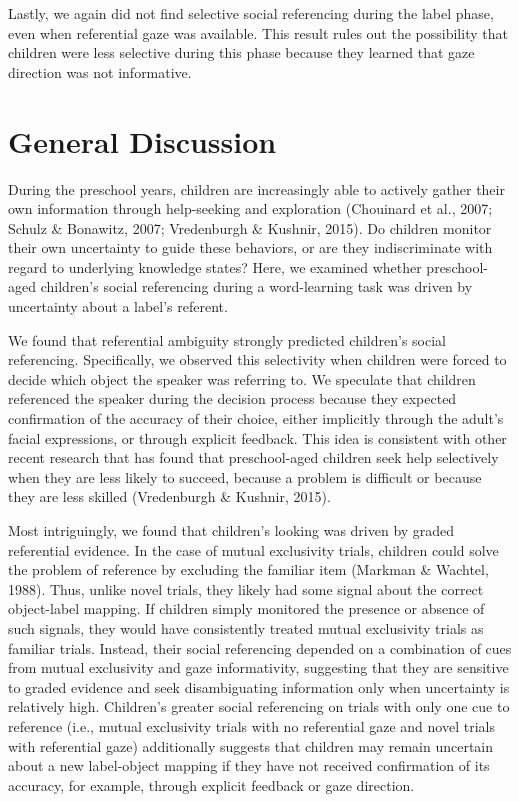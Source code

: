 \documentclass[10pt, letterpaper]{article}
\begin{document}
Lastly, we again did not find selective social referencing during the
label phase, even when referential gaze was available. This result rules
out the possibility that children were less selective during this phase
because they learned that gaze direction was not informative.

\section{General Discussion}\label{general-discussion}

During the preschool years, children are increasingly able to actively
gather their own information through help-seeking and exploration
(Chouinard et al., 2007; Schulz \& Bonawitz, 2007; Vredenburgh \&
Kushnir, 2015). Do children monitor their own uncertainty to guide these
behaviors, or are they indiscriminate with regard to underlying
knowledge states? Here, we examined whether preschool-aged children's
social referencing during a word-learning task was driven by uncertainty
about a label's referent.

We found that referential ambiguity strongly predicted children's social
referencing. Specifically, we observed this selectivity when children
were forced to decide which object the speaker was referring to. We
speculate that children referenced the speaker during the decision
process because they expected confirmation of the accuracy of their
choice, either implicitly through the adult's facial expressions, or
through explicit feedback. This idea is consistent with other recent
research that has found that preschool-aged children seek help
selectively when they are less likely to succeed, because a problem is
difficult or because they are less skilled (Vredenburgh \& Kushnir,
2015).

Most intriguingly, we found that children's looking was driven by graded
referential evidence. In the case of mutual exclusivity trials, children
could solve the problem of reference by excluding the familiar item
(Markman \& Wachtel, 1988). Thus, unlike novel trials, they likely had
some signal about the correct object-label mapping. If children simply
monitored the presence or absence of such signals, they would have
consistently treated mutual exclusivity trials as familiar trials.
Instead, their social referencing depended on a combination of cues from
mutual exclusivity and gaze informativity, suggesting that they are
sensitive to graded evidence and seek disambiguating information only
when uncertainty is relatively high. Children's greater social
referencing on trials with only one cue to reference (i.e., mutual
exclusivity trials with no referential gaze and novel trials with
referential gaze) additionally suggests that children may remain
uncertain about a new label-object mapping if they have not received
confirmation of its accuracy, for example, through explicit feedback or
gaze direction.
\end{document}
